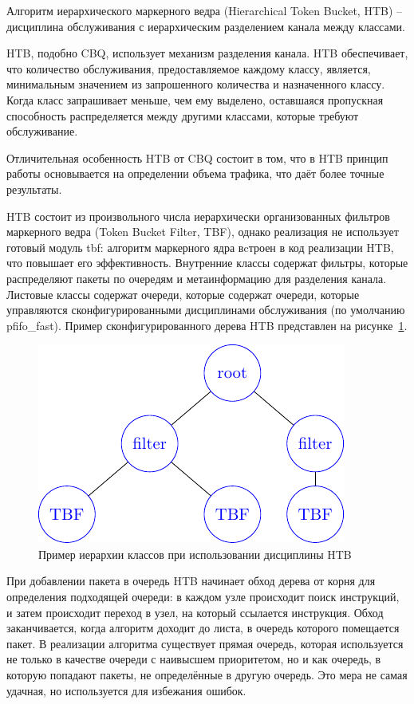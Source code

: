         Алгоритм иерархического маркерного ведра (Hierarchical Token Bucket, HTB) -- дисциплина
        обслуживания с иерархическим разделением канала между классами.

		HTB, подобно CBQ, использует механизм разделения канала. 
		HTB обеспечивает, что количество обслуживания, предоставляемое каждому классу, является,
		минимальным значением из запрошенного количества и назначенного классу. Когда класс
		запрашивает меньше, чем ему выделено, оставшаяся пропускная способность распределяется между
		другими классами, которые требуют обслуживание.\cite{htb}

		Отличительная особенность HTB от CBQ состоит в том, что в HTB принцип работы
		основывается на определении объема трафика\cite{lartc}, что даёт более точные результаты.

		HTB состоит из произвольного числа иерархически организованных фильтров
		маркерного ведра (Token Bucket Filter, TBF)\cite{packethandling},
		однако реализация не использует готовый
		модуль tbf: алгоритм маркерного ядра вcтроен в код реализации
		HTB, что повышает его эффективность. Внутренние классы содержат
		фильтры, которые распределяют пакеты по очередям и метаинформацию
		для разделения канала. Листовые
		классы содержат очереди, которые содержат очереди, которые
		управляются сконфигурированными дисциплинами обслуживания (по
		умолчанию pfifo\_fast). Пример сконфигурированного дерева
		HTB представлен на рисунке~\ref{pic:htb_hier}.
		
        \begin{figure}[ht!]
            \center
            \includegraphics[scale=1.4]{./pdfimages/class_hierh_htb.pdf}
            \caption{Пример иерархии классов при использовании дисциплины HTB}
			\label{pic:htb_hier}
        \end{figure}

        При добавлении пакета в очередь HTB начинает обход дерева от корня
        для определения подходящей очереди: в каждом узле происходит поиск
        инструкций, и затем происходит переход в узел, на который ссылается
        инструкция. Обход заканчивается, когда алгоритм доходит до листа,
        в очередь которого помещается пакет.\cite{tchtb} В реализации алгоритма
		существует прямая очередь, которая используется не только в качестве
		очереди с наивысшем приоритетом, но и как очередь, в которую попадают
		пакеты, не определённые в другую очередь. Это мера не самая удачная,
		но используется для избежания ошибок.

